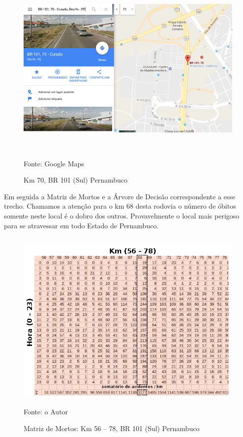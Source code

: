 \pagebreak


\begin{figure}[htbp!]
	\centering
	\caption{Km 70, BR 101 (Sul) Pernambuco}
	\label{fig:Km70BR101}
	\includegraphics[width=150mm, height=95mm]{Figuras/Resultados/Km70BR101}\\
	\tiny Fonte: Google Maps
\end{figure}

\vspace{7mm}

Em seguida a Matriz de Mortos e a Árvore de Decisão correspondente a esse trecho. Chamamos a atenção para o km 68 desta rodovia o número de óbitos somente neste local é o dobro dos outros. Provavelmente o local mais perigoso para se atravessar em todo Estado de Pernambuco.

\begin{figure}[htbp!]
	\centering
	\caption{Matriz de Mortos: Km 56 -- 78, BR 101 (Sul) Pernambuco}
	\label{fig:MatrizMortos2d-101}
	\includegraphics[width=120mm, height=90mm]{Figuras/Resultados/MM2d101}\\
	\tiny Fonte: o Autor
\end{figure}


